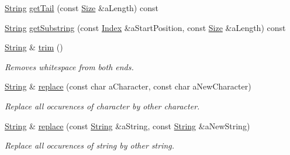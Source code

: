 \begin{DoxyCompactItemize}
\item 
\mbox{\hyperlink{classlibrary_1_1core_1_1types_1_1_string}{String}} \mbox{\hyperlink{classlibrary_1_1core_1_1types_1_1_string_ac1c579d8fe140ab627b679e1d372746a}{get\+Tail}} (const \mbox{\hyperlink{namespacelibrary_1_1core_1_1types_a701626ea1027888ebbb8cfd0ff7adab0}{Size}} \&a\+Length) const
\item 
\mbox{\hyperlink{classlibrary_1_1core_1_1types_1_1_string}{String}} \mbox{\hyperlink{classlibrary_1_1core_1_1types_1_1_string_aaf9377048b900766d05a1af9182cf251}{get\+Substring}} (const \mbox{\hyperlink{namespacelibrary_1_1core_1_1types_ad87eeb821d7067ec94e06ed1980d6350}{Index}} \&a\+Start\+Position, const \mbox{\hyperlink{namespacelibrary_1_1core_1_1types_a701626ea1027888ebbb8cfd0ff7adab0}{Size}} \&a\+Length) const
\item 
\mbox{\hyperlink{classlibrary_1_1core_1_1types_1_1_string}{String}} \& \mbox{\hyperlink{classlibrary_1_1core_1_1types_1_1_string_a42426ffb11bb0b2789ba0991064a01b5}{trim}} ()
\begin{DoxyCompactList}\small\item\em Removes whitespace from both ends. \end{DoxyCompactList}\item 
\mbox{\hyperlink{classlibrary_1_1core_1_1types_1_1_string}{String}} \& \mbox{\hyperlink{classlibrary_1_1core_1_1types_1_1_string_a8d4100938450cb4c4bba2c3e49d1871d}{replace}} (const char a\+Character, const char a\+New\+Character)
\begin{DoxyCompactList}\small\item\em Replace all occurences of character by other character. \end{DoxyCompactList}\item 
\mbox{\hyperlink{classlibrary_1_1core_1_1types_1_1_string}{String}} \& \mbox{\hyperlink{classlibrary_1_1core_1_1types_1_1_string_a33f558b912c1f24a109e985c3a180f22}{replace}} (const \mbox{\hyperlink{classlibrary_1_1core_1_1types_1_1_string}{String}} \&a\+String, const \mbox{\hyperlink{classlibrary_1_1core_1_1types_1_1_string}{String}} \&a\+New\+String)
\begin{DoxyCompactList}\small\item\em Replace all occurences of string by other string. \end{DoxyCompactList}\end{DoxyCompactItemize}
